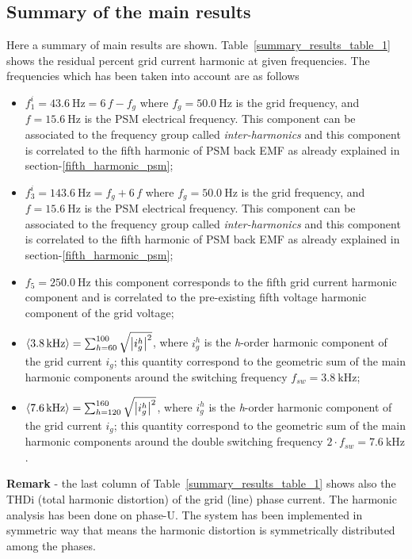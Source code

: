 \documentclass[12pt,a4paper]{scrartcl}
\begin{document}
\begin{onehalfspace}
\section{Summary of the main results}
Here a summary of main results are shown. Table~\ref{summary_results_table_1} shows the residual percent grid current harmonic at given frequencies. The frequencies which has been taken into account are as follows
\begin{itemize}
	\item[--] $f_1^i = \SI{43.6}{\hertz} = 6\,f - f_g$ where $f_g = \SI{50.0}{\hertz}$ is the grid frequency, and $f=\SI{15.6}{\hertz}$ is the PSM electrical frequency. This component can be associated to the frequency group called \textit{inter-harmonics} and this component is correlated to the fifth harmonic of PSM back EMF as already explained in section-\ref{fifth_harmonic_psm};
	\item[--] $f_3^i = \SI{143.6}{\hertz} = f_g + 6\,f$ where $f_g = \SI{50.0}{\hertz}$ is the grid frequency, and $f=\SI{15.6}{\hertz}$ is the PSM electrical frequency. This component can be associated to the frequency group called \textit{inter-harmonics} and this component is correlated to the fifth harmonic of PSM back EMF as already explained in section-\ref{fifth_harmonic_psm};
	\item[--] $f_5 = \SI{250.0}{\hertz}$ this component corresponds to the fifth grid current harmonic component and is correlated to the pre-existing fifth voltage harmonic component of the grid voltage;
	\item[--] $\left\langle \SI{3.8}{\kilo\hertz}\right\rangle  = \sum_{h=60}^{100} \sqrt{\abs{i_g^h}^2}$, where $i_g^h$ is the \textit{h}-order harmonic component of the grid current $i_g$; this quantity correspond to the geometric sum of the main harmonic components around the switching frequency $f_{sw} = \SI{3.8}{\kilo\hertz}$;
	\item[--] $\left\langle\SI{7.6}{\kilo\hertz}\right\rangle = \sum_{h=120}^{160} \sqrt{\abs{i_g^h}^2}$, where $i_g^h$ is the \textit{h}-order harmonic component of the grid current $i_g$; this quantity correspond to the geometric sum of the main harmonic components around the double switching frequency $2\cdot f_{sw} = \SI{7.6}{\kilo\hertz}$.
\end{itemize}
\noindent\textbf{Remark} - the last column of Table~\ref{summary_results_table_1} shows also the THDi (total harmonic distortion) of the grid (line) phase current. The harmonic analysis has been done on phase-U. The system has been implemented in symmetric way that means the harmonic distortion is symmetrically distributed among the phases. 


\end{onehalfspace}
\end{document}
